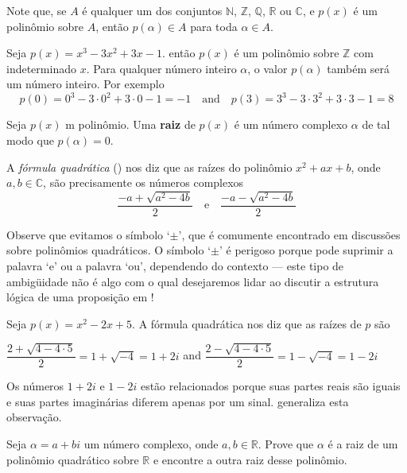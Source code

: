 Note que, se $A$ é qualquer um dos conjuntos $\mathbb{N}$, $\mathbb{Z}$, $\mathbb{Q}$, $\mathbb{R}$ ou $\mathbb{C}$, e $p(x)$ é um polinômio sobre $A$, então $p(\alpha) \in A$ para toda $\alpha \in A$.

\begin{example}
Seja $p(x)=x^3-3x^2+3x-1$. então $p(x)$ é um polinômio sobre $\mathbb{Z}$ com indeterminado $x$. Para qualquer número inteiro $\alpha$, o valor $p(\alpha)$ também será um número inteiro. Por exemplo
\[ p(0) = 0^3-3 \cdot 0^2 + 3 \cdot 0 - 1 = -1 \quad \text{and} \quad p(3) = 3^3 - 3 \cdot 3^2 + 3 \cdot 3 - 1 = 8 \]
\end{example}

\begin{definition}
\label{defRootOfPolynomial}
Seja $p(x)$ m polinômio. Uma \textbf{raiz} de $p(x)$ é um número complexo $\alpha$ de tal modo que $p(\alpha)=0$.
\end{definition}

A \textit{fórmula quadrática} () nos diz que as raízes do polinômio $x^2+ax+b$, onde $a,b \in \mathbb{C}$, são precisamente os números complexos
\[ \frac{-a+\sqrt{a^2-4b}}{2} \quad \text{e} \quad \frac{-a-\sqrt{a^2-4b}}{2} \]

Observe que evitamos o símbolo `$\pm$', que é comumente encontrado em discussões sobre polinômios quadráticos. O símbolo `$\pm$' é perigoso porque pode suprimir a palavra `e' ou a palavra `ou', dependendo do contexto --- este tipo de ambigüidade não é algo com o qual desejaremos lidar ao discutir a estrutura lógica de uma proposição em !

\begin{example}
\label{exApplicationOfQuadraticFormula}
Seja $p(x)=x^2-2x+5$. A fórmula quadrática nos diz que as raízes de $p$ são
\begin{center}
$\dfrac{2 + \sqrt{4 - 4 \cdot 5}}{2} = 1 + \sqrt{-4} = 1+2i$
\quad and \quad
$\dfrac{2 - \sqrt{4 - 4 \cdot 5}}{2} = 1-\sqrt{-4} = 1-2i$
\end{center}
Os números $1+2i$ e $1-2i$ estão relacionados porque suas partes reais são iguais e suas partes imaginárias diferem apenas por um sinal.  generaliza esta observação.
\end{example}

\begin{exercise}
\label{exComplexNumberAsRootOfQuadraticOverR}
Seja $\alpha = a+bi$ um número complexo, onde $a,b \in \mathbb{R}$. Prove que $\alpha$ é a raiz de um polinômio quadrático sobre $\mathbb{R}$ e encontre a outra raiz desse polinômio.
\end{exercise}

